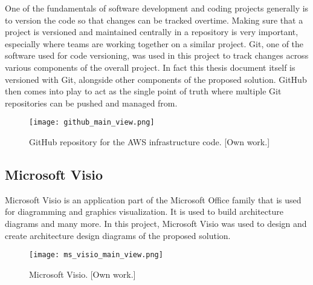 One of the fundamentals of software development and coding projects generally is to version the code so that changes can be tracked overtime. Making sure that a project is versioned and maintained centrally in a repository is very important, especially where teams are working together on a similar project. Git, one of the software used for code versioning, was used in this project to track changes across various components of the overall project. In fact this thesis document itself is versioned with Git, alongside other components of the proposed solution. GitHub then comes into play to act as the single point of truth where multiple Git repositories can be pushed and managed from.

\begin{figure}[H]
    \centering \texttt{[image: github\_main\_view.png]}
    \caption{GitHub repository for the AWS infrastructure code. [Own work.]}
    \label{fig:github}
\end{figure}



\subsection{Microsoft Visio}
\label{subsec:ms-visio}

Microsoft Visio is an application part of the Microsoft Office family that is used for diagramming and graphics visualization. It is used to build architecture diagrams and many more. In this project, Microsoft Visio was used to design and create architecture design diagrams of the proposed solution.

\begin{figure}[H]
    \centering \texttt{[image: ms\_visio\_main\_view.png]}
    \caption{Microsoft Visio. [Own work.]}
    \label{fig:ms-visio}
\end{figure}







